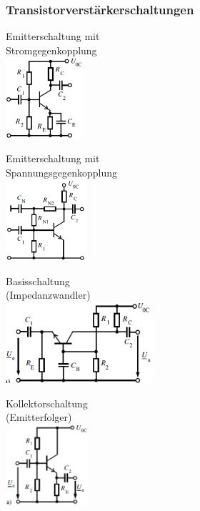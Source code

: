   \subsubsection{Transistorverst\"arkerschaltungen}
    \begin{minipage}[T]{4.7cm}
      Emitterschaltung mit\\
      Stromgegenkopplung\\
      \includegraphics[height=3cm]{./bilder/BipTraEmitterschStGk.png}
    \end{minipage}
    \begin{minipage}[T]{4.7cm}
      Emitterschaltung mit\\
      Spannungsgegenkopplung\\
      \includegraphics[height=3cm]{./bilder/BipTraEmitterschSpGk.png}
    \end{minipage}
    \begin{minipage}[T]{5.7cm}
      Basisschaltung\\
      (Impedanzwandler)\\
      \includegraphics[height=3cm]{./bilder/BipTraBasissch.png}
    \end{minipage}
    \begin{minipage}[T]{3.7cm}
      Kollektorschaltung\\
      (Emitterfolger)\\
      \includegraphics[height=3cm]{./bilder/BipTraKollektorsch.png}
    \end{minipage}
    

